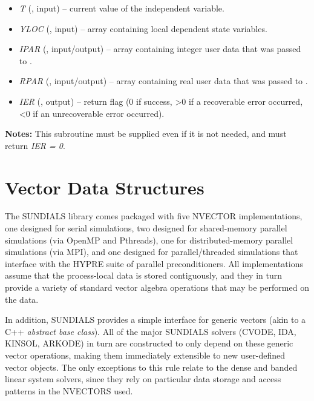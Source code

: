 \documentclass[letterpaper,10pt,english]{sphinxmanual}
\begin{document}
\begin{enumerate}
\begin{fulllineitems}
\begin{description}
\begin{itemize}
\item {} 
\emph{T} (, input) -- current value of the
independent variable.

\item {} 
\emph{YLOC} (, input) -- array containing local
dependent state variables.

\item {} 
\emph{IPAR} (, input/output) -- array containing
integer user data that was passed to
{\hyperref[f_interface/Usage:f/_/FARKMALLOC]{\emph{}}}.

\item {} 
\emph{RPAR} (, input/output) -- array containing
real user data that was passed to {\hyperref[f_interface/Usage:f/_/FARKMALLOC]{\emph{}}}.

\item {} 
\emph{IER} (, output) -- return flag (0 if success, \textgreater{}0
if a recoverable error occurred, \textless{}0 if an unrecoverable
error occurred).

\end{itemize}

\end{description}

\textbf{Notes:}
This subroutine must be supplied even if it is not needed, and
must return \emph{IER = 0}.

\end{fulllineitems}


\end{enumerate}


\chapter{Vector Data Structures}
\label{nvectors/index:nvectors}\label{nvectors/index::doc}\label{nvectors/index:vector-data-structures}
The SUNDIALS library comes packaged with five NVECTOR implementations,
one designed for serial simulations, two designed for shared-memory
parallel simulations (via OpenMP and Pthreads), one for
distributed-memory parallel simulations (via MPI), and one designed
for parallel/threaded simulations that interface with the HYPRE suite
of parallel preconditioners.  All implementations assume that the
process-local data is stored contiguously, and they in turn provide a
variety of standard vector algebra operations that may be performed on
the data.

In addition, SUNDIALS provides a simple interface for generic vectors
(akin to a C++ \emph{abstract base class}).  All of the major SUNDIALS
solvers (CVODE, IDA, KINSOL, ARKODE) in turn are constructed to only
depend on these generic vector operations, making them immediately
extensible to new user-defined vector objects.  The only exceptions to
this rule relate to the dense and banded linear system solvers, since
they rely on particular data storage and access patterns in the
NVECTORS used.
\end{document}
